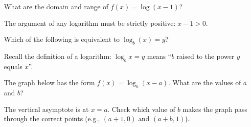 \documentclass{ximera}
\begin{document}
\begin{problem}
What are the domain and range of $f(x) = \log(x-1)$?
\begin{hint}
The argument of any logarithm must be strictly positive: $x-1>0$.
\end{hint}
\begin{multipleChoice}
\end{multipleChoice}
\end{problem}

\begin{problem}
Which of the following is equivalent to $\log_b(x) = y$?
\begin{hint}
Recall the definition of a logarithm: $\log_b x = y$ means ``$b$ raised to the power $y$ equals $x$''.
\end{hint}
\begin{multipleChoice}
\end{multipleChoice}
\end{problem}

\begin{problem}
The graph below has the form $f(x) = \log_b(x-a)$. What are the values of $a$ and $b$?

\begin{center}
\end{center}

\begin{hint}
The vertical asymptote is at $x=a$. Check which value of $b$ makes the graph pass through the correct points (e.g., $(a+1,0)$ and $(a+b,1)$).
\end{hint}
\begin{multipleChoice}
\end{multipleChoice}
\end{problem}
\end{document}
